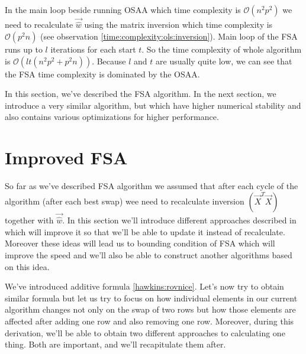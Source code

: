 \begin{observation}  \label{time:complexity:fsa}
In the main loop beside running OSAA which time complexity is $\mathcal{O}(n^2p^2)$ we need to recalculate $\vec{\hat{w}}$ using the matrix inversion which time complexity is $\mathcal{O}(p^2n)$ (see observation \ref{time:complexity:ols:inversion}).
Main loop of the FSA runs up to $l$ iterations for each start $t$. So the time complexity of whole algorithm is  $\mathcal{O}( lt(n^2p^2 + p^2n)  )$. Because $l$ and $t$ are usually quite low, we can see that the FSA time complexity is dominated by the OSAA. 
\end{observation} 

In this section, we've described the FSA algorithm. In the next section, we introduce a very similar algorithm, but which have higher numerical stability and also contains various optimizations for higher performance.

















\section{Improved FSA} %
So far as we've described FSA algorithm we assumed that after each cycle of the algorithm (after each best swap) wee need to recalculate inversion $(\vec{X}^T\vec{X})$ together with $\vec{\hat{w}}$. In this section we'll introduce different approaches described in \cite{agullo2001new} which will improve it so that we'll be able to update it instead of recalculate. Moreover these ideas will lead us to bounding condition of FSA which will improve the speed and we'll also be able to construct another algorithms based on this idea. 

We've introduced additive formula \ref{hawkins:rovnice}. Let's now try to obtain similar formula but let us try to focus on how individual elements in our current algorithm changes not only on the swap of two rows but how those elements are affected after adding one row and also removing one row. Moreover, during this derivation, we'll be able to obtain two different approaches to calculating one thing. Both are important, and we'll recapitulate them after.


